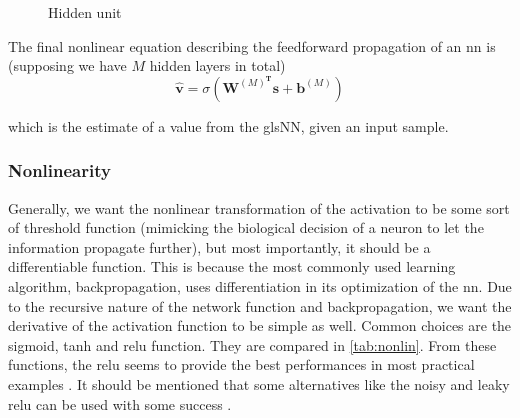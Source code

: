 \begin{figure}
\centering
{}
\caption[Hidden units]{Hidden unit}
\label{fig:hu}
\end{figure}

The final nonlinear equation describing the feedforward propagation of an \gls{nn} is (supposing we have $M$ hidden layers in total)
\begin{equation}
\mathbf{\hat{v}}=\sigma \left(\mathbf{W}^{(M)^{\mathbf{T}}} \mathbf{s} + \mathbf{b}^{(M)}\right)
\end{equation}

which is the estimate of a value from the gls{NN}, given an input sample.

\subsubsection*{Nonlinearity}
Generally, we want the nonlinear transformation of the activation to be some sort of threshold function (mimicking the biological decision of a neuron to let the information propagate further), but most importantly, it should be a differentiable function. This is because the most commonly used learning algorithm, backpropagation, uses differentiation in its optimization of the \gls{nn}. Due to the recursive nature of the network function and backpropagation, we want the derivative of the activation function to be simple as well. Common choices are the sigmoid, tanh and \gls{relu} function. They are compared in \ref{tab:nonlin}. From these functions, the \gls{relu} seems to provide the best performances in most practical examples \cite{mishkin16}. It should be mentioned that some alternatives like the noisy and leaky \gls{relu} can be used with some success \cite{vinod10,maas14}.


